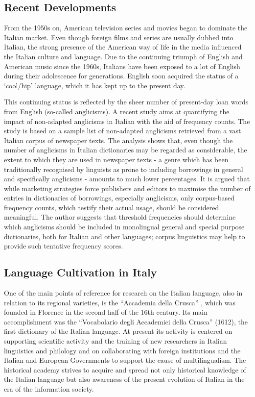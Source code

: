 \documentclass[]{../../metanetpaper}
\begin{document}
\begin{multicols}{2}
\subsection{Recent Developments}

From the 1950s on, American television series and movies began to dominate the
Italian market. Even though foreign films and series are usually dubbed into
Italian, the strong presence of the American way of life in the media
influenced the Italian culture and language. Due to the continuing triumph of
English and American music since the 1960s, Italians have been exposed to a
lot of English during their adolescence for generations. English soon acquired
the status of a `cool/hip' language, which it has kept up to the present
day.

This continuing status is reflected by the sheer number of present-day loan
words from English (so-called anglicisms). A recent study \cite{Fischer} aims
at quantifying the impact of non-adapted anglicisms in Italian with the aid of
frequency counts. The study is based on a sample list of non-adapted anglicisms
retrieved from a vast Italian corpus of newspaper texts. The analysis shows
that, even though the number of anglicisms in Italian dictionaries may be
regarded as considerable, the extent to which they are used in newspaper texts
- a genre which has been traditionally recognised by linguists as prone to
including borrowings in general and specifically anglicisms - amounts to much
lower percentages. It is argued that while marketing strategies force
publishers and editors to maximise the number of entries in dictionaries of
borrowings, especially anglicisms, only corpus-based frequency counts, which
testify their actual usage, should be considered meaningful. The author
suggests that threshold frequencies should determine which anglicisms should
be included in monolingual general and special purpose dictionaries, both for
Italian and other languages; corpus linguistics may help to provide such
tentative frequency scores.




\subsection{Language Cultivation in Italy}

One of the main points of reference for research on the Italian language, also
in relation to its regional varieties, is the “Accademia della Crusca”
\cite{Crusca}, which was founded in Florence in the second half of the 16th
century. Its main accomplishment was the “Vocabolario degli Accademici della
Crusca” (1612), the first dictionary of the Italian language. At present its
activity is centered on supporting scientific activity and the training of new
researchers in Italian linguistics and philology and on collaborating with
foreign institutions and the Italian and European Governments to support the
cause of multilingualism. The historical academy strives to acquire and spread
not only historical knowledge of the Italian language but also awareness of
the present evolution of Italian in the era of the information society.




\end{multicols}
\end{document}
